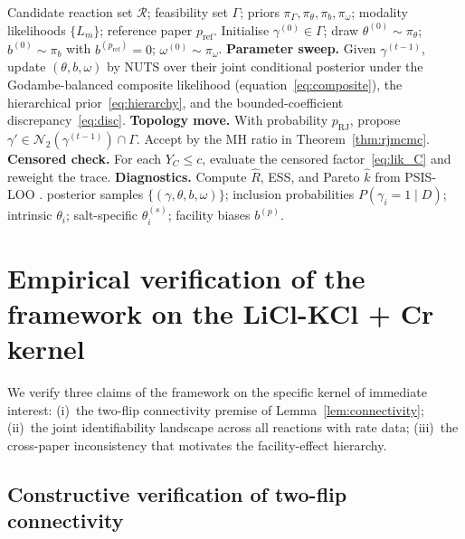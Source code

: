 \documentclass[11pt]{article}
\theoremstyle{definition}
\theoremstyle{remark}
\begin{document}
\begin{algorithm}
\caption{HBMAE constrained-hierarchical-censored RJMCMC}\label{alg:hbmae}
\begin{algorithmic}[1]
\Require Candidate reaction set $\mathcal R$; feasibility set $\Gamma$; priors $\pi_\Gamma,\pi_\theta,\pi_b,\pi_\omega$; modality likelihoods $\{L_m\}$; reference paper $p_{\mathrm{ref}}$.
\State Initialise $\gamma^{(0)}\in\Gamma$; draw $\theta^{(0)}\sim\pi_\theta$; $b^{(0)}\sim\pi_b$ with $b^{(p_{\mathrm{ref}})}=0$; $\omega^{(0)}\sim\pi_\omega$.
  \State \textbf{Parameter sweep.} Given $\gamma^{(t-1)}$, update $(\theta,b,\omega)$ by NUTS over their joint conditional posterior under the Godambe-balanced composite likelihood (equation~\eqref{eq:composite}), the hierarchical prior~\eqref{eq:hierarchy}, and the bounded-coefficient discrepancy~\eqref{eq:disc}.
  \State \textbf{Topology move.} With probability $p_{\mathrm{RJ}}$, propose $\gamma'\in\mathcal N_2(\gamma^{(t-1)})\cap\Gamma$. Accept by the MH ratio in Theorem~\ref{thm:rjmcmc}.
  \State \textbf{Censored check.} For each $Y_C\le c$, evaluate the censored factor~\eqref{eq:lik_C} and reweight the trace.
\EndFor
\State \textbf{Diagnostics.} Compute $\hat R$, ESS, and Pareto $\hat k$ from PSIS-LOO \citep{Vehtari2017}.
\State \Return posterior samples $\{(\gamma,\theta,b,\omega)\}$; inclusion probabilities $P(\gamma_i=1\mid D)$; intrinsic $\theta_i$; salt-specific $\theta_i^{(s)}$; facility biases $b^{(p)}$.
\end{algorithmic}
\end{algorithm}

\section{Empirical verification of the framework on the LiCl-KCl + Cr kernel}\label{sec:empirical}

We verify three claims of the framework on the specific kernel of immediate interest:
(i)~the two-flip connectivity premise of Lemma~\ref{lem:connectivity};
(ii)~the joint identifiability landscape across all reactions with rate data;
(iii)~the cross-paper inconsistency that motivates the facility-effect hierarchy.

\subsection{Constructive verification of two-flip connectivity}\label{sec:connectivity_verif}
\end{document}
